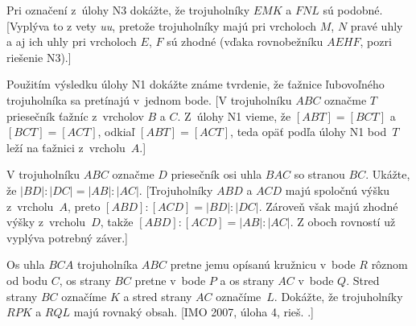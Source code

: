 {Pri označení z~úlohy N3 dokážte, že trojuholníky $EMK$ a $FNL$ sú podobné.
[Vyplýva to z vety \emph{uu}, pretože trojuholníky majú pri vrcholoch $M$, $N$
pravé uhly a aj ich uhly pri vrcholoch $E$, $F$ sú zhodné (vďaka
rovnobežníku $AEHF$, pozri riešenie N3).]

\D
Použitím výsledku úlohy N1 dokážte známe tvrdenie, že ťažnice
ľubovoľného trojuholníka sa pretínajú v~jednom bode.
[V trojuholníku $ABC$ označme $T$ priesečník ťažníc z~vrcholov $B$ a $C$.
Z~úlohy N1 vieme, že {$[ABT] = [BCT]$ a $[BCT] = [ACT]$,
odkiaľ $[ABT] = [ACT]$}, teda opäť podľa úlohy N1 bod~$T$
leží na ťažnici z~vrcholu~$A$.]


V trojuholníku $ABC$ označme $D$ priesečník osi uhla $BAC$ so stranou $BC$.
Ukážte, že $|BD|:|DC|=|AB|:|AC|$.
[Trojuholníky $ABD$ a $ACD$ majú spoločnú výšku z~vrcholu~$A$,
preto $[ABD]:[ACD] =|BD|:|DC|$.
Zároveň však majú zhodné výšky z~vrcholu~$D$, takže
$[ABD]:[ACD]=|AB|:|AC|$. Z oboch rovností už vyplýva potrebný záver.]

Os uhla $BCA$ trojuholníka $ABC$ pretne jemu
opísanú kružnicu v~bode $R$ rôznom od bodu $C$, os strany $BC$
pretne v~bode $P$ a os strany $AC$ v~bode $Q$. Stred strany $BC$
označíme $K$ a stred strany $AC$ označíme~$L$. Dokážte, že
trojuholníky $RPK$ a $RQL$ majú rovnaký obsah.
[IMO 2007, úloha 4, rieš. .]
}

